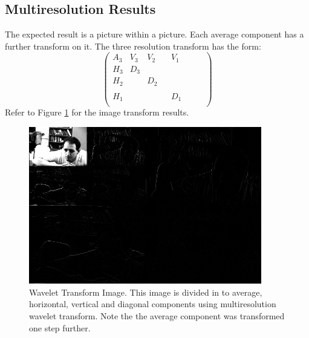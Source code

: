 \subsection {Multiresolution Results}
The expected result is a picture within a picture.  Each average component has a further transform on it.  The three resolution transform has the form:
\[
\left(\begin{array}{cccccccc}A_3 & V_3 & V_2 &  & V_1 &  &  &  \\H_3 & D_3 &  &  &  &  &  &  \\H_2 &  & D_2 &  &  &  &  &  \\ &  &  &  &  &  &  &  \\H_1 &  &  &  & D_1 &  &  &  \\ &  &  &  &  &  &  &  \end{array}\right)
\]
Refer to Figure \ref{wavepicR3} for the image transform results.  

\begin{figure}[htb]
\begin{center}
\includegraphics [width=4in]{wavepic3R.jpg}
\end{center}
\caption{Wavelet Transform Image.  This image is divided in to average, horizontal, vertical and diagonal components using multiresolution wavelet transform.  Note the the average component was transformed one step further. }   
\label{wavepicR3}
\end{figure}

